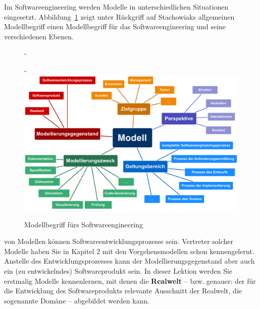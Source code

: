 Im Softwareengineering werden Modelle in unterschiedlichen Situationen eingesetzt. Abbildung~\ref{fig:modellbegriff_softwareengineering} zeigt unter Rückgriff auf Stachowiaks allgemeinen Modellbegriff einen Modellbegriff für das Softwareengineering und seine verschiedenen Ebenen.

\begin{figure}[t]
	\begin{addmargin*}[0cm]{-\marginparwidth}
	\begin{addmargin*}[0cm]{-\marginparsep}
		\includegraphics[scale=0.62]{Bilder/Kapitel-3/Abb-3-1-MindMap.pdf}
		\caption{Modellbegriff fürs Softwareengineering}
		\label{fig:modellbegriff_softwareengineering}
	\end{addmargin*}
	\end{addmargin*}
\end{figure}		

\vspace{1mm} %

von Modellen können Softwareentwicklungsprozesse sein. Vertreter solcher Modelle haben Sie in Kapitel 2 %
mit den Vorgehensmodellen schon kennengelernt. Anstelle des Entwicklungsprozesses kann der Modellierungs\-gegenstand aber auch ein (zu entwickelndes) Softwareprodukt sein. In dieser Lektion werden Sie erstmalig Modelle kennenlernen, mit denen die \textbf{Realwelt} – bzw. genauer: der für die Entwicklung des Softwareprodukts relevante Ausschnitt der Realwelt, die sogenannte Domäne – abgebildet werden kann.

